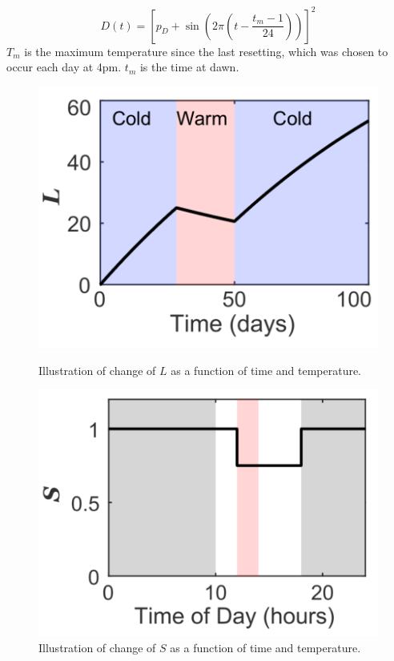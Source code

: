 \documentclass[11pt, a4paper]{article}
\begin{document}
\begin{equation}
    D(t) =  \left[p_D + \sin\left(2\pi\left(t - \frac{t_m-1}{24}\right)\right)\right]^2
    \label{eq:Dt}
\end{equation}
$T_m$ is the maximum temperature since the last resetting, which was chosen to occur each day at 4pm.
$t_m$ is the time at dawn.
\begin{figure}[H]
    \centering
    \begin{minipage}{0.4\textwidth}
        \centering
        \includegraphics[width=1.0\textwidth]{./images/param_L.png}
        \caption{Illustration of change of $L$ as a function of time and temperature.}
        \label{fig:param_L}
    \end{minipage}
    \hfill
    \begin{minipage}{0.4\textwidth}
        \centering
        \includegraphics[width=1.0\textwidth]{./images/param_S.png}
        \caption{Illustration of change of $S$ as a function of time and temperature.}
        \label{fig:param_S}
    \end{minipage}
\end{figure}
\end{document}
